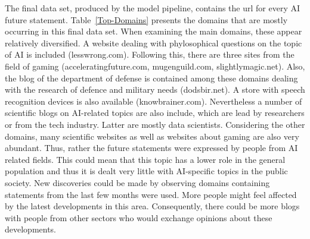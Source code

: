 The final data set, produced by the model pipeline, contains the url for every AI future statement.
Table~\ref{Top-Domains} presents the domains that are mostly occurring in this final data set.
When examining the main domains, these appear relatively  diversified.
A website dealing with phylosophical questions on the topic of AI is included (lesswrong.com).
Following this, there are three sites from the field of gaming (acceleratingfuture.com, mugenguild.com, slightlymagic.net).
Also, the blog of the department of defense is contained among these domains dealing with the research of defence and military needs (dodsbir.net).
A store with speech recognition devices is also available (knowbrainer.com).
Nevertheless a number of scientific blogs on AI-related topics are also include, which are lead by researchers or from the tech industry.
Latter are mostly data scientists.
Considering the other domains, many scientific websites as well as websites about gaming are also very abundant.
Thus, rather the future statements were expressed by people from AI related fields.
This could mean that this topic has a lower role in the general population and thus it is dealt very little with AI-specific topics in the public society.
New discoveries could be made by observing domains containing statements from the last few months were used.
More people might feel affected by the latest developments in this area.
Consequently, there could be more blogs with people from other sectors who would exchange opinions about these developments.
